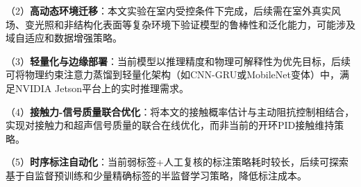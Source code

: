 （2）\textbf{高动态环境迁移}：本文实验在室内受控条件下完成，后续需在室外真实风场、变光照和非结构化表面等复杂环境下验证模型的鲁棒性和泛化能力，可能涉及域自适应和数据增强策略。

（3）\textbf{轻量化与边缘部署}：当前模型以推理精度和物理可解释性为优先目标，后续可将物理约束注意力蒸馏到轻量化架构（如CNN-GRU或MobileNet变体）中，满足NVIDIA Jetson平台上的实时推理需求。

（4）\textbf{接触力-信号质量联合优化}：将本文的接触概率估计与主动阻抗控制相结合，实现对接触力和超声信号质量的联合在线优化，而非当前的开环PID接触维持策略。

（5）\textbf{时序标注自动化}：当前弱标签+人工复核的标注策略耗时较长，后续可探索基于自监督预训练和少量精确标签的半监督学习策略，降低标注成本。